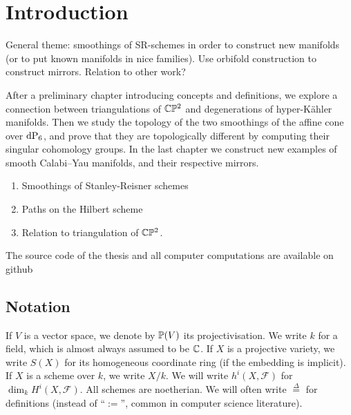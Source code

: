 \chapter{Introduction}
\label{sec:intro}

General theme: smoothings of SR-schemes in order to construct new manifolds (or to put known manifolds in nice families). Use orbifold construction to construct mirrors. Relation to other work?
    
After a preliminary chapter introducing concepts and definitions, we explore a connection between triangulations of $\C \P^2$ and degenerations of hyper-Kähler manifolds. Then we study the topology of the two smoothings of the affine cone over $\dP6$, and prove that they are topologically different by computing their singular cohomology groups. In the last chapter we construct new examples of smooth Calabi--Yau manifolds, and their respective mirrors.

\begin{enumerate}
    \item Smoothings of Stanley-Reisner schemes
    \item Paths on the Hilbert scheme
    \item Relation to triangulation of $\C \P^2$.
\end{enumerate}

The source code of the thesis and all computer computations are available on github



\section{Notation}

If $V$ is a vector space, we denote by $\P(V)$ its projectivisation. We write $k$ for a field, which is almost always assumed to be $\C$. If $X$ is a projective variety, we write $S(X)$ for its homogeneous coordinate ring (if the embedding is implicit). If $X$ is a scheme over $k$, we write $X/k$. We will write $h^i(X,\mathscr F)$ for $\dim_k H^i(X,\mathscr F)$. All schemes are noetherian. We will often write $\stackrel \Delta = $ for definitions (instead of  ``$:=$'', common in computer science literature).